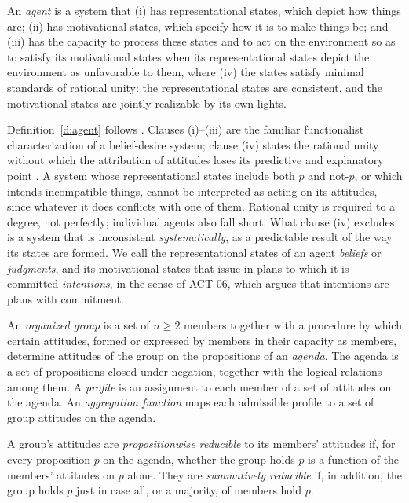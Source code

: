 \documentclass{situationist-preprint}
\begin{document}
\begin{definition}[Agent]\label{d:agent}
An \emph{agent} is a system that (i) has representational states, which depict how things are; (ii) has motivational states, which specify how it is to make things be; and (iii) has the capacity to process these states and to act on the environment so as to satisfy its motivational states when its representational states depict the environment as unfavorable to them, where (iv) the states satisfy minimal standards of rational unity: the representational states are consistent, and the motivational states are jointly realizable by its own lights.
\end{definition}

Definition~\ref{d:agent} follows \citet[ch.~1]{ListPettit2011}. Clauses (i)--(iii) are the familiar functionalist characterization of a belief-desire system; clause (iv) states the rational unity without which the attribution of attitudes loses its predictive and explanatory point \citep{Dennett1987}. A system whose representational states include both $p$ and not-$p$, or which intends incompatible things, cannot be interpreted as acting on its attitudes, since whatever it does conflicts with one of them. Rational unity is required to a degree, not perfectly; individual agents also fall short. What clause (iv) excludes is a system that is inconsistent \emph{systematically}, as a predictable result of the way its states are formed. We call the representational states of an agent \emph{beliefs} or \emph{judgments}, and its motivational states that issue in plans to which it is committed \emph{intentions}, in the sense of ACT-06, which argues that intentions are plans with commitment.

\begin{definition}\label{d:group}
An \emph{organized group} is a set of $n \geq 2$ members together with a procedure by which certain attitudes, formed or expressed by members in their capacity as members, determine attitudes of the group on the propositions of an \emph{agenda}. The agenda is a set of propositions closed under negation, together with the logical relations among them. A \emph{profile} is an assignment to each member of a set of attitudes on the agenda. An \emph{aggregation function} maps each admissible profile to a set of group attitudes on the agenda.
\end{definition}

\begin{definition}\label{d:red}
A group's attitudes are \emph{propositionwise reducible} to its members' attitudes if, for every proposition $p$ on the agenda, whether the group holds $p$ is a function of the members' attitudes on $p$ alone. They are \emph{summatively reducible} if, in addition, the group holds $p$ just in case all, or a majority, of members hold $p$.
\end{definition}
\end{document}
